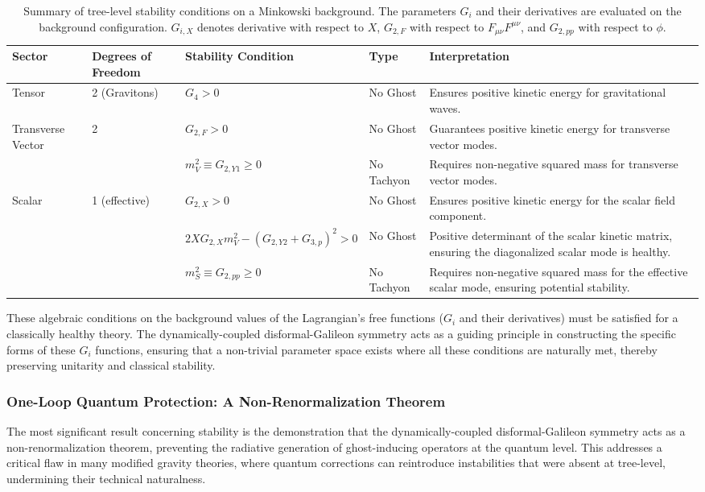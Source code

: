 \documentclass[twocolumn]{aastex631}
\begin{document}
\begin{table}[ht!]
\caption{Summary of tree-level stability conditions on a Minkowski background. The parameters $G_i$ and their derivatives are evaluated on the background configuration. $G_{i,X}$ denotes derivative with respect to $X$, $G_{2,F}$ with respect to $F_{\mu\nu}F^{\mu\nu}$, and $G_{2,pp}$ with respect to $\phi$.}
\label{tab:stability_conditions}
\centering
\begin{tabular}{p{} p{} p{} p{} p{}}
\hline
\textbf{Sector} & \textbf{Degrees of Freedom} & \textbf{Stability Condition} & \textbf{Type} & \textbf{Interpretation} \\
\hline
Tensor & 2 (Gravitons) & $G_4 > 0$ & No Ghost & Ensures positive kinetic energy for gravitational waves. \\
Transverse Vector & 2 & $G_{2,F} > 0$ & No Ghost & Guarantees positive kinetic energy for transverse vector modes. \\
& & $m_V^2 \equiv G_{2,Y1} \ge 0$ & No Tachyon & Requires non-negative squared mass for transverse vector modes. \\
Scalar & 1 (effective) & $G_{2,X} > 0$ & No Ghost & Ensures positive kinetic energy for the scalar field component. \\
& & $2X G_{2,X} m_V^2 - (G_{2,Y2} + G_{3,p})^2 > 0$ & No Ghost & Positive determinant of the scalar kinetic matrix, ensuring the diagonalized scalar mode is healthy. \\
& & $m_S^2 \equiv G_{2,pp} \ge 0$ & No Tachyon & Requires non-negative squared mass for the effective scalar mode, ensuring potential stability. \\
\hline
\end{tabular}
\end{table}

These algebraic conditions on the background values of the Lagrangian's free functions ($G_i$ and their derivatives) must be satisfied for a classically healthy theory. The dynamically-coupled disformal-Galileon symmetry acts as a guiding principle in constructing the specific forms of these $G_i$ functions, ensuring that a non-trivial parameter space exists where all these conditions are naturally met, thereby preserving unitarity and classical stability.

\subsubsection{One-Loop Quantum Protection: A Non-Renormalization Theorem}
The most significant result concerning stability is the demonstration that the dynamically-coupled disformal-Galileon symmetry acts as a non-renormalization theorem, preventing the radiative generation of ghost-inducing operators at the quantum level. This addresses a critical flaw in many modified gravity theories, where quantum corrections can reintroduce instabilities that were absent at tree-level, undermining their technical naturalness.
\end{document}
